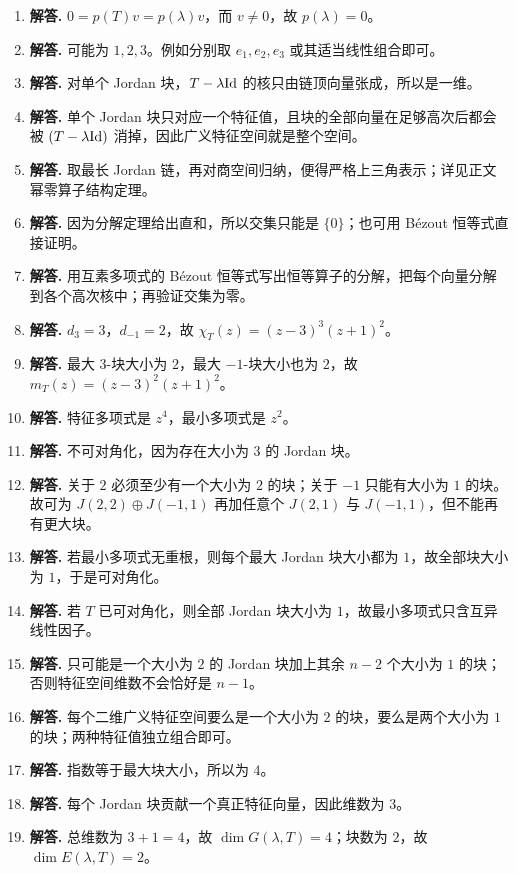 \begin{enumerate}[label=\textbf{\arabic*.}, leftmargin=*, itemsep=1em]
\item \textbf{解答.} $0=p(T)v=p(\lambda)v$，而 $v\neq0$，故 $p(\lambda)=0$。
\item \textbf{解答.} 可能为 $1,2,3$。例如分别取 $e_1,e_2,e_3$ 或其适当线性组合即可。
\item \textbf{解答.} 对单个 Jordan 块，$T-\lambda\mathrm{Id}$ 的核只由链顶向量张成，所以是一维。
\item \textbf{解答.} 单个 Jordan 块只对应一个特征值，且块的全部向量在足够高次后都会被 $(T-\lambda\mathrm{Id})$ 消掉，因此广义特征空间就是整个空间。
\item \textbf{解答.} 取最长 Jordan 链，再对商空间归纳，便得严格上三角表示；详见正文幂零算子结构定理。
\item \textbf{解答.} 因为分解定理给出直和，所以交集只能是 $\{0\}$；也可用 Bézout 恒等式直接证明。
\item \textbf{解答.} 用互素多项式的 Bézout 恒等式写出恒等算子的分解，把每个向量分解到各个高次核中；再验证交集为零。
\item \textbf{解答.} $d_3=3$，$d_{-1}=2$，故 $\chi_T(z)=(z-3)^3(z+1)^2$。
\item \textbf{解答.} 最大 $3$-块大小为 $2$，最大 $-1$-块大小也为 $2$，故 $m_T(z)=(z-3)^2(z+1)^2$。
\item \textbf{解答.} 特征多项式是 $z^4$，最小多项式是 $z^2$。
\item \textbf{解答.} 不可对角化，因为存在大小为 $3$ 的 Jordan 块。
\item \textbf{解答.} 关于 $2$ 必须至少有一个大小为 $2$ 的块；关于 $-1$ 只能有大小为 $1$ 的块。故可为 $J(2,2)\oplus J(-1,1)$ 再加任意个 $J(2,1)$ 与 $J(-1,1)$，但不能再有更大块。
\item \textbf{解答.} 若最小多项式无重根，则每个最大 Jordan 块大小都为 $1$，故全部块大小为 $1$，于是可对角化。
\item \textbf{解答.} 若 $T$ 已可对角化，则全部 Jordan 块大小为 $1$，故最小多项式只含互异线性因子。
\item \textbf{解答.} 只可能是一个大小为 $2$ 的 Jordan 块加上其余 $n-2$ 个大小为 $1$ 的块；否则特征空间维数不会恰好是 $n-1$。
\item \textbf{解答.} 每个二维广义特征空间要么是一个大小为 $2$ 的块，要么是两个大小为 $1$ 的块；两种特征值独立组合即可。
\item \textbf{解答.} 指数等于最大块大小，所以为 $4$。
\item \textbf{解答.} 每个 Jordan 块贡献一个真正特征向量，因此维数为 $3$。
\item \textbf{解答.} 总维数为 $3+1=4$，故 $\dim G(\lambda,T)=4$；块数为 $2$，故 $\dim E(\lambda,T)=2$。

\end{enumerate}
